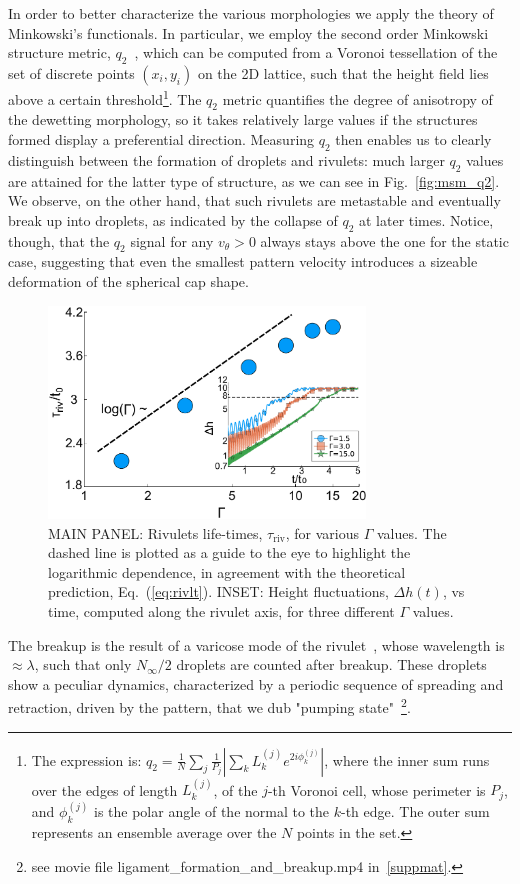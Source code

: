 In order to better characterize the various morphologies we apply the theory of Minkowski's functionals. 
In particular, we employ the second order Minkowski structure metric, $q_2$~\cite{mickelShortcomingsBondOrientational2013, schallerPapaya22DIrreducible2020}, which can be computed from a Voronoi tessellation of the set of discrete points $(x_i, y_i)$ on the 2D lattice, such that the height field lies above a certain threshold\footnote{The expression is: $q_2 = \frac{1}{N}\sum_j \frac{1}{P_j}|\sum_k L^{(j)}_k e^{2i\phi^{(j)}_k}|$, where the inner sum runs over the edges of length $L^{(j)}_k$, of the $j$-th Voronoi cell, whose perimeter is $P_j$, and $\phi^{(j)}_k$ is the polar angle of the normal to the $k$-th edge. 
The outer sum represents an ensemble average over the $N$ points in the set.}. 
The $q_2$ metric quantifies the degree of anisotropy of the dewetting morphology, so it takes relatively large values if the structures formed display a preferential direction. 
Measuring $q_2$ then enables us to clearly distinguish between the formation of droplets and rivulets: much larger $q_2$ values are attained for the latter type of structure, as we can see in Fig.~\ref{fig:msm_q2}.
We observe, on the other hand, that such rivulets are metastable and eventually break up into droplets, as indicated by the collapse of $q_2$ at later times. 
Notice, though, that the $q_2$ signal for any $v_{\theta} >0$ always stays above the one for the static case, suggesting that even the smallest pattern velocity introduces a sizeable deformation of the spherical cap shape.
\begin{figure}
    \centering
    \includegraphics[width=0.75\textwidth]{graphics/Figure_5.pdf}
    \caption{MAIN PANEL: Rivulets life-times, $\tau_{\text{riv}}$, for various $\Gamma$ values.
    The dashed line is plotted as a guide to the eye to highlight the logarithmic dependence, in agreement with the theoretical prediction, Eq.~(\ref{eq:rivlt}).
    INSET: Height fluctuations, $\Delta h(t)$, vs time, computed along the rivulet axis, for three different $\Gamma$ values.
    }
    \label{fig:stab_ligs_lam2}
\end{figure}
The breakup is the result of a varicose mode of the rivulet~\cite{diezBreakupFluidRivulets2009, mechkovStabilityLiquidRidges2008}, whose wavelength is $\approx\lambda$, such that only $N_{\infty}/2$ droplets are counted after breakup. 
These droplets show a peculiar dynamics, characterized by a periodic sequence of spreading and retraction, driven by the pattern, that we dub "pumping state"~\footnote{see movie file ligament\_formation\_and\_breakup.mp4 in~\ref{suppmat}.}.

